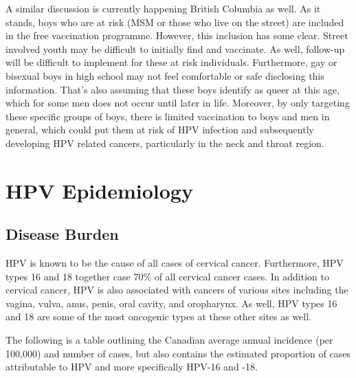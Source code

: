 \documentclass[12pt]{article}
\begin{document}
A similar discussion is currently happening British Columbia as well.  As it stands, boys who are at risk (MSM or those who live on the street) are included in the free vaccination programme.  However, this inclusion has some clear.  Street involved youth may be difficult to initially find and vaccinate.  As well, follow-up will be difficult to implement for these at risk individuals.   Furthermore, gay or bisexual boys in high school may not feel comfortable or safe disclosing this information.  That's also assuming that these boys identify as queer at this age, which for some men does not occur until later in life.  Moreover, by only targeting these specific groups of boys, there is limited vaccination to boys and men in general, which could put them at risk of HPV infection and subsequently developing HPV related cancers, particularly in the neck and throat region.  

\section{HPV Epidemiology}

\subsection*{Disease Burden}

HPV is known to be the cause of all cases of cervical cancer.  Furthermore, HPV types 16 and 18 together case 70\% of all cervical cancer cases.  In addition to cervical cancer, HPV is also associated with cancers of various sites including the vagina, vulva, anus, penis, oral cavity, and oropharynx.  As well, HPV types 16 and 18 are some of the most oncogenic types at these other sites as well.  

The following is a table outlining the Canadian average annual incidence (per 100,000) and number of cases, but also contains the estimated proportion of cases attributable to HPV and more specifically HPV-16 and -18.  
\end{document}
